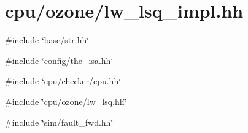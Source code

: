 \hypertarget{lw__lsq__impl_8hh}{
\section{cpu/ozone/lw\_\-lsq\_\-impl.hh}
\label{lw__lsq__impl_8hh}
}
{\ttfamily \#include \char`\"{}base/str.hh\char`\"{}}\par
{\ttfamily \#include \char`\"{}config/the\_\-isa.hh\char`\"{}}\par
{\ttfamily \#include \char`\"{}cpu/checker/cpu.hh\char`\"{}}\par
{\ttfamily \#include \char`\"{}cpu/ozone/lw\_\-lsq.hh\char`\"{}}\par
{\ttfamily \#include \char`\"{}sim/fault\_\-fwd.hh\char`\"{}}\par
